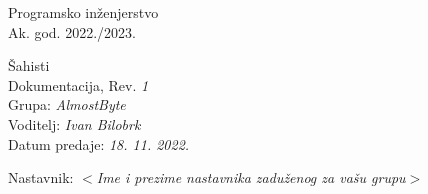 \documentclass{article}
\begin{document}
\newenvironment{packed_enum}{
	\begin{enumerate}
		\setlength{\itemsep}{0pt}
		\setlength{\parskip}{0pt}
		\setlength{\parsep}{0pt}
	}{\end{enumerate}}

\newenvironment{packed_item}{
	\begin{itemize}
		\setlength{\itemsep}{0pt}
		\setlength{\parskip}{0pt}
		\setlength{\parsep}{0pt}
	}{\end{itemize}}
	
		\begin{titlepage}
		\begin{center}
			\LARGE Programsko inženjerstvo\\
			\large Ak. god. 2022./2023.\\
			
			
			\huge Šahisti\\
			\Large Dokumentacija, Rev. \textit{1}\\
			
			\normalsize
			Grupa: \textit{AlmostByte}\\
			Voditelj: \textit{Ivan Bilobrk}\\
			
			
			Datum predaje: \textit{18. 11. 2022.}\\
			
			
			Nastavnik: \textit{$<$Ime i prezime nastavnika zaduženog za vašu grupu$>$}\\
			
		\end{center}
		
		
	\end{titlepage}

	\tableofcontents
	\eject
		
\end{document}
